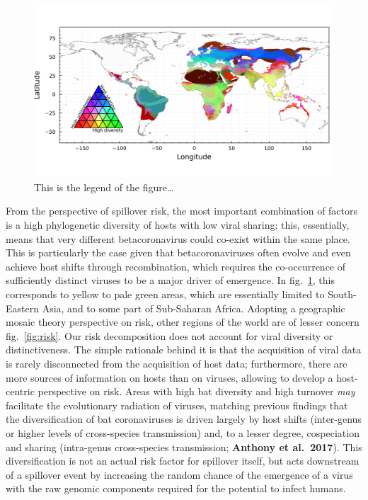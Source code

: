 \documentclass[11pt]{article}
\makeatletter
\def\maxwidth{\ifdim\Gin@nat@width>\linewidth\linewidth
\else\Gin@nat@width\fi}
\let\Oldincludegraphics\includegraphics
\renewcommand{\includegraphics}[1]{\Oldincludegraphics[width=\maxwidth]{#1}}
\makeatother
\begin{document}
\begin{figure}
\hypertarget{fig:trivariate}{%
\centering
\includegraphics{figures/risk_trivariate.png}
\caption{This is the legend of the figure\ldots{}}\label{fig:trivariate}
}
\end{figure}

From the perspective of spillover risk, the most important combination
of factors is a high phylogenetic diversity of hosts with low viral
sharing; this, essentially, means that very different betacoronavirus
could co-exist within the same place. This is particularly the case
given that betacoronaviruses often evolve and even achieve host shifts
through recombination, which requires the co-occurrence of sufficiently
distinct viruses to be a major driver of emergence. In
fig.~\ref{fig:trivariate}, this corresponds to yellow to pale green
areas, which are essentially limited to South-Eastern Asia, and to some
part of Sub-Saharan Africa. Adopting a geographic mosaic theory
perspective on risk, other regions of the world are of lesser concern
fig.~\ref{fig:risk}. Our risk decomposition does not account for viral
diversity or distinctiveness. The simple rationale behind it is that the
acquisition of viral data is rarely disconnected from the acquisition of
host data; furthermore, there are more sources of information on hosts
than on viruses, allowing to develop a host-centric perspective on risk.
Areas with high bat diversity and high turnover \emph{may} facilitate
the evolutionary radiation of viruses, matching previous findings that
the diversification of bat coronaviruses is driven largely by host
shifts (inter-genus or higher levels of cross-species transmission) and,
to a lesser degree, cospeciation and sharing (intra-genus cross-species
transmission; \textbf{Anthony et al.~2017}). This diversification is not
an actual risk factor for spillover itself, but acts downstream of a
spillover event by increasing the random chance of the emergence of a
virus with the raw genomic components required for the potential to
infect humans.
\end{document}

